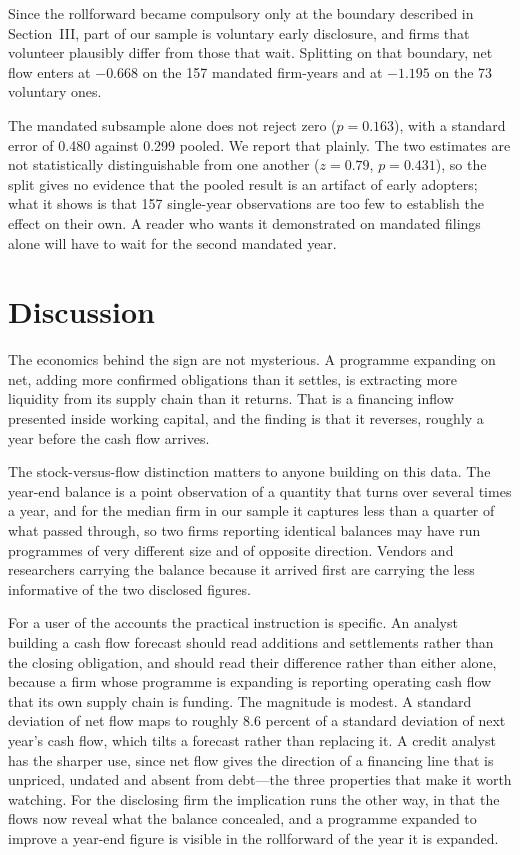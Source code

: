 \documentclass[conference,a4paper]{IEEEtran}
\begin{document}
Since the rollforward became compulsory only at the boundary described in
Section~III, part of our sample is voluntary early disclosure, and firms that
volunteer plausibly differ from those that wait. Splitting on that boundary,
net flow enters at $-0.668$ on the 157 mandated firm-years and at $-1.195$ on
the 73 voluntary ones.

The mandated subsample alone does not reject zero ($p = 0.163$), with a standard
error of 0.480 against 0.299 pooled. We report that plainly. The two estimates
are not statistically distinguishable from one another ($z = 0.79$,
$p = 0.431$), so the split gives no evidence that the pooled result is an
artifact of early adopters; what it shows is that 157 single-year observations
are too few to establish the effect on their own. A reader who wants it
demonstrated on mandated filings alone will have to wait for the second mandated
year.

\section{Discussion}

The economics behind the sign are not mysterious. A programme expanding on net,
adding more confirmed obligations than it settles, is extracting more liquidity
from its supply chain than it returns. That is a financing inflow presented
inside working capital, and the finding is that it reverses, roughly a year
before the cash flow arrives.

The stock-versus-flow distinction matters to anyone building on this data. The
year-end balance is a point observation of a quantity that turns over several
times a year, and for the median firm in our sample it captures less than a
quarter of what passed through, so two firms reporting identical balances may
have run programmes of very different size and of opposite direction. Vendors
and researchers carrying the balance because it arrived first are carrying the
less informative of the two disclosed figures.

For a user of the accounts the practical instruction is specific. An analyst
building a cash flow forecast should read additions and settlements rather than
the closing obligation, and should read their difference rather than either
alone, because a firm whose programme is expanding is reporting operating cash
flow that its own supply chain is funding. The magnitude is modest. A standard
deviation of net flow maps to roughly 8.6 percent of a standard deviation of
next year's cash flow, which tilts a forecast rather than replacing it. A credit
analyst has the sharper use, since net flow gives the direction of a financing
line that is unpriced, undated and absent from debt---the three properties that
make it worth watching. For the disclosing firm the
implication runs the other way, in that the flows now reveal what the balance
concealed, and a programme expanded to improve a year-end figure is visible in
the rollforward of the year it is expanded.
\end{document}
